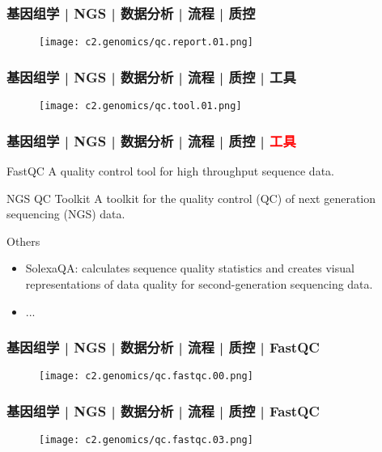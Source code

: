 \begin{frame}
  \frametitle{基因组学 | NGS | 数据分析 | 流程 | 质控}
  \begin{figure}
    \centering
    \texttt{[image: c2.genomics/qc.report.01.png]}
  \end{figure}
\end{frame}

\begin{frame}
  \frametitle{基因组学 | NGS | 数据分析 | 流程 | 质控 | 工具}
  \begin{figure}
    \centering
    \texttt{[image: c2.genomics/qc.tool.01.png]}
  \end{figure}
\end{frame}

\begin{frame}
  \frametitle{基因组学 | NGS | 数据分析 | 流程 | 质控 | \textcolor{red}{工具}}
  \begin{block}{FastQC}
    A quality control tool for high throughput sequence data.
  \end{block}
  \pause
  \begin{block}{NGS QC Toolkit}
    A toolkit for the quality control (QC) of next generation sequencing (NGS) data.
  \end{block}
  \pause
  \begin{block}{Others}
    \begin{itemize}
      \item SolexaQA: calculates sequence quality statistics and creates visual representations of data quality for second-generation sequencing data.
      \item ...
    \end{itemize}
  \end{block}
\end{frame}

\begin{frame}
  \frametitle{基因组学 | NGS | 数据分析 | 流程 | 质控 | FastQC}
  \begin{figure}
    \centering
    \texttt{[image: c2.genomics/qc.fastqc.00.png]}
  \end{figure}
\end{frame}

\begin{frame}
  \frametitle{基因组学 | NGS | 数据分析 | 流程 | 质控 | FastQC}
  \begin{figure}
    \centering
    \texttt{[image: c2.genomics/qc.fastqc.03.png]}
  \end{figure}
\end{frame}

